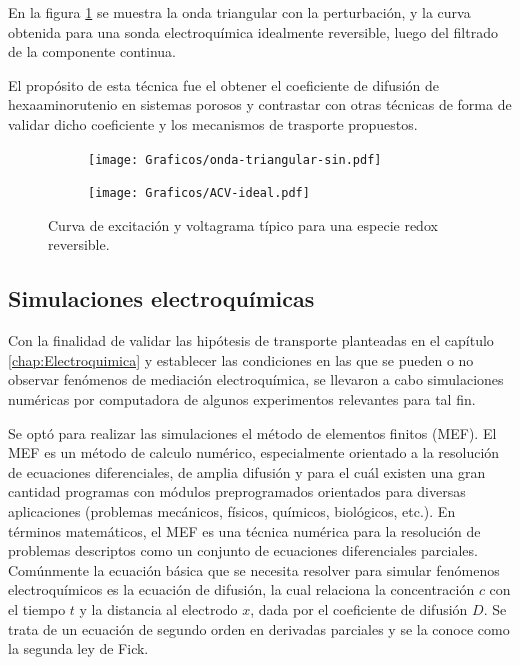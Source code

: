 	 		En la figura \ref{fig:ACV_ideal} se muestra la onda triangular con la perturbación, y la curva obtenida para una sonda electroquímica idealmente reversible, luego del filtrado de la componente continua.

	 		El propósito de esta técnica fue el obtener el coeficiente de difusión de hexaaminorutenio en sistemas porosos y contrastar con otras técnicas de forma de validar dicho coeficiente y los mecanismos de trasporte propuestos. 

	 			 \begin{figure}[hb!]
			  		  \begin{subfigure}[t]{0.495\textwidth}
			  		  \texttt{[image: Graficos/onda-triangular-sin.pdf]}
			  		  \end{subfigure}
			  		  \begin{subfigure}[t]{0.495\textwidth}
			  		  \texttt{[image: Graficos/ACV-ideal.pdf]}
			  		  \end{subfigure}
			  		  \caption[Voltamperometria ideal reversible]{Curva de excitación y voltagrama típico para una especie redox reversible.}
			  		  \label{fig:ACV_ideal}
			  		  \end{figure}
	 		
	 		
			
	 \subsection{Simulaciones electroquímicas}\label{simulacion}

	 	 Con la finalidad de validar las hipótesis de transporte planteadas en el capítulo \ref{chap:Electroquimica} y establecer las condiciones en las que se pueden o no observar fenómenos de mediación electroquímica, se llevaron a cabo simulaciones numéricas por computadora de algunos experimentos relevantes para tal fin.

	 	 Se optó para realizar las simulaciones el método de elementos finitos (MEF). El MEF es un método de calculo numérico, especialmente orientado a la resolución de ecuaciones diferenciales, de amplia difusión y para el cuál existen una gran cantidad programas con módulos preprogramados orientados para diversas aplicaciones (problemas mecánicos, físicos, químicos, biológicos, etc.). En términos matemáticos, el MEF es una técnica numérica para la resolución de problemas descriptos como un conjunto de ecuaciones diferenciales parciales. Comúnmente la ecuación básica que se necesita resolver para simular fenómenos electroquímicos es la ecuación de difusión, la cual relaciona la concentración $c$ con el tiempo $t$ y la distancia al electrodo $x$, dada por el coeficiente de difusión $D$.\cite{Britz2005,Nann2003} Se trata de un ecuación de segundo orden en derivadas parciales y se la conoce como la segunda ley de Fick.\cite{fick1855}

